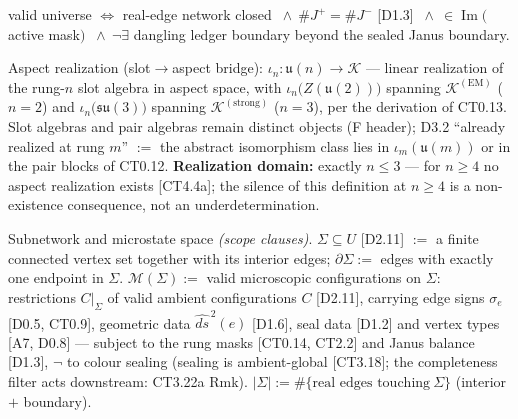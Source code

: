 \begin{definition}[{\texorpdfstring{D2.11}{D2.11}}]\label{tag:D2-11}
valid universe $\iff$ real-edge network closed $\ \wedge\ \#J^+=\#J^-$ [D1.3] $\ \wedge\ \in\operatorname{Im}($active mask$)$ $\ \wedge\ \neg\exists$ dangling ledger boundary beyond the sealed Janus boundary.

\end{definition}

\begin{definition}[{\texorpdfstring{D2.12}{D2.12}}]\label{tag:D2-12}
Aspect realization (slot$\to$aspect bridge): $\iota_n:\mathfrak u(n)\to\mathcal K$ — linear realization of the rung-$n$ slot algebra in aspect space, with $\iota_n\bigl(Z(\mathfrak u(2))\bigr)$ spanning $\mathcal K^{(\mathrm{EM})}$ ($n=2$) and $\iota_n\bigl(\mathfrak{su}(3)\bigr)$ spanning $\mathcal K^{(\mathrm{strong})}$ ($n=3$), per the derivation of CT0.13. Slot algebras and pair algebras remain distinct objects (F header); D3.2 “already realized at rung $m$” $:=$ the abstract isomorphism class lies in $\iota_m(\mathfrak u(m))$ or in the pair blocks of CT0.12. \textbf{Realization domain:} exactly $n\le3$ — for $n\ge4$ no aspect realization exists [CT4.4a]; the silence of this definition at $n\ge4$ is a non-existence consequence, not an underdetermination.

\end{definition}

\begin{definition}[{\texorpdfstring{D2.13}{D2.13}}]\label{tag:D2-13}
Subnetwork and microstate space \textit{(scope clauses)}. $\Sigma\subseteq U$ [D2.11] $:=$ a finite connected vertex set together with its interior edges; $\partial\Sigma:=$ edges with exactly one endpoint in $\Sigma$. $\mathcal M(\Sigma):=$ valid microscopic configurations on $\Sigma$: restrictions $C|_\Sigma$ of valid ambient configurations $C$ [D2.11], carrying edge signs $\sigma_e$ [D0.5, CT0.9], geometric data $\widehat{ds}^{\,2}(e)$ [D1.6], seal data [D1.2] and vertex types [A7, D0.8] — subject to the rung masks [CT0.14, CT2.2] and Janus balance [D1.3], $\neg$ to colour sealing (sealing is ambient-global [CT3.18]; the completeness filter acts downstream: CT3.22a Rmk). $|\Sigma|:=\#\{\text{real edges touching}\ \Sigma\}$ (interior $+$ boundary).

\end{definition}


